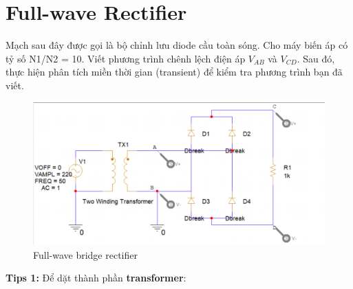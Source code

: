 \section{Full-wave Rectifier}
Mạch sau đây được gọi là bộ chỉnh lưu diode cầu toàn sóng. Cho máy biến áp có tỷ số N1/N2 = 10. Viết phương trình chênh lệch điện áp \(V_{AB}\) và \(V_{CD}\).
Sau đó, thực hiện phân tích miền thời gian (transient) để kiểm tra phương trình bạn đã viết.
\begin{figure}[ht]
    {\centering
    \includegraphics[scale=0.27]{graphics/ex7/f1.png}
    \caption{Full-wave bridge rectifier}}
\end{figure}
    \textbf{Tips 1:} Để dặt thành phần \textbf{transformer}: 
